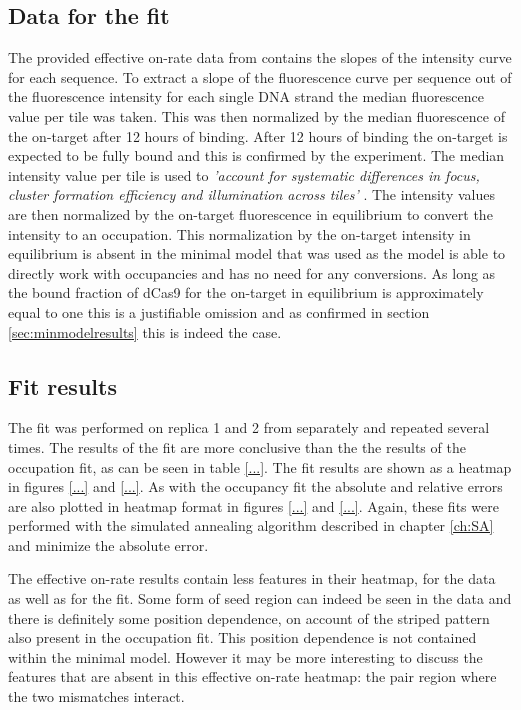 \subsection{Data for the fit}
\label{sec:DetailsDataOnRate}
The provided effective on-rate data from \cite{PNAS} contains the slopes of the intensity curve for each sequence. To extract a slope of the fluorescence curve per sequence out of the fluorescence intensity for each single DNA strand the median fluorescence value per tile was taken. This was then normalized by the median fluorescence of the on-target after 12 hours of binding. After 12 hours of binding the on-target is expected to be fully bound and this is confirmed by the experiment. The median intensity value per tile is used to \textit{'account for systematic differences in focus, cluster formation efficiency and illumination across tiles'} \citep{PNAS}. The intensity values are then normalized by the on-target fluorescence in equilibrium to convert the intensity to an occupation. This normalization by the on-target intensity in equilibrium is absent in the minimal model that was used as the model is able to directly work with occupancies and has no need for any conversions. As long as the bound fraction of dCas9 for the on-target in equilibrium is approximately equal to one this is a justifiable omission and as confirmed in section \ref{sec:minmodelresults} this is indeed the case.

\subsection{Fit results}
The fit was performed on replica 1 and 2 from \citep{PNAS} separately and repeated several times. The results of the fit are more conclusive than the the results of the occupation fit, as can be seen in table \ref{...}. The fit results are shown as a heatmap in figures \ref{...} and \ref{...}. As with the occupancy fit the absolute and relative errors are also plotted in heatmap format in figures \ref{...} and \ref{...}. Again, these fits were performed with the simulated annealing algorithm described in chapter \ref{ch:SA} and minimize the absolute error.


The effective on-rate results contain less features in their heatmap, for the data as well as for the fit. Some form of seed region can indeed be seen in the data and there is definitely some position dependence, on account of the striped pattern also present in the occupation fit. This position dependence is not contained within the minimal model. However it may be more interesting to discuss the features that are absent in this effective on-rate heatmap: the pair region where the two mismatches interact.


